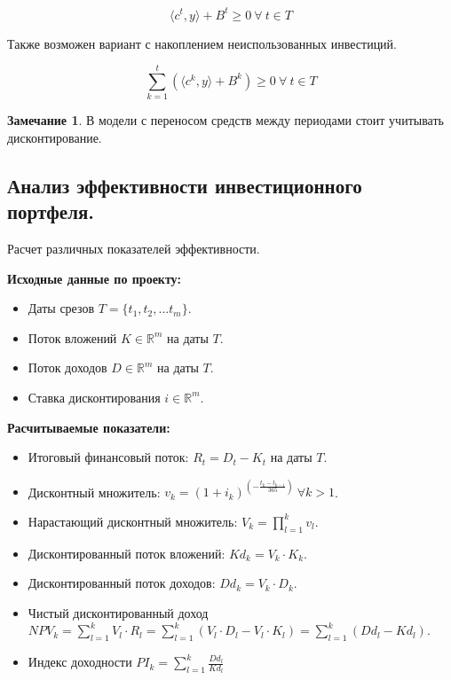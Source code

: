 \documentclass[reqno]{article}
\theoremstyle{definition}
\newtheorem*{nb}{Замечание}
\theoremstyle{definition}
\theoremstyle{definition}
\theoremstyle{definition}
\theoremstyle{definition}
\theoremstyle{definition}
\theoremstyle{definition}
\theoremstyle{definition}
\theoremstyle{definition}
\begin{document}
			$$\langle c^t, y\rangle + B^t \geq 0\ \forall\ t \in T$$
			
			Также возможен вариант с накоплением неиспользованных инвестиций.
			
			$$\sum\limits^{t}_{k=1} (\langle c^k, y\rangle + B^k) \geq 0\ \forall\ t \in T$$

			\begin{nb}
				В модели с переносом средств между периодами стоит учитывать дисконтирование.	
			\end{nb}
		
		\subsection{Анализ эффективности инвестиционного портфеля.}
		
		Расчет различных показателей эффективности.
		
		\textbf{Исходные данные по проекту:}
		\begin{itemize}
			\item Даты срезов $T = \{t_1, t_2, ... t_m\}$.
			\item Поток вложений $K \in \mathds{R}^m$ на даты $T$.
			\item Поток доходов $D \in \mathds{R}^m$ на даты $T$.
			\item Ставка дисконтирования $i \in \mathds{R}^m$.
		\end{itemize}
	
		\textbf{Расчитываемые показатели:}
		\begin{itemize}
			\item Итоговый финансовый поток: $R_t = D_t - K_t$ на даты $T$.
			\item Дисконтный множитель: $v_k = (1 + i_k)^{(- \frac{t_k - t_{k-1}}{365})}\ \forall k > 1$.
			\item Нарастающий дисконтный множитель: $V_k = \prod\limits^k_{l = 1} v_l$.
			\item Дисконтированный поток вложений: ${Kd}_k = V_k\cdot K_k$.
			\item Дисконтированный поток доходов: ${Dd}_k = V_k\cdot D_k$.
			\item Чистый дисконтированный доход $NPV_k = \sum\limits^k_{l = 1} V_l\cdot R_l = \sum\limits^k_{l = 1} (V_l\cdot D_l - V_l\cdot K_l) = \sum\limits^k_{l = 1} ({Dd}_l - {Kd}_l)$.
			\item Индекс доходности ${PI}_k = \sum\limits^k_{l=1} \frac{{Dd}_l}{{Kd}_l}$
		\end{itemize}
\end{document}
